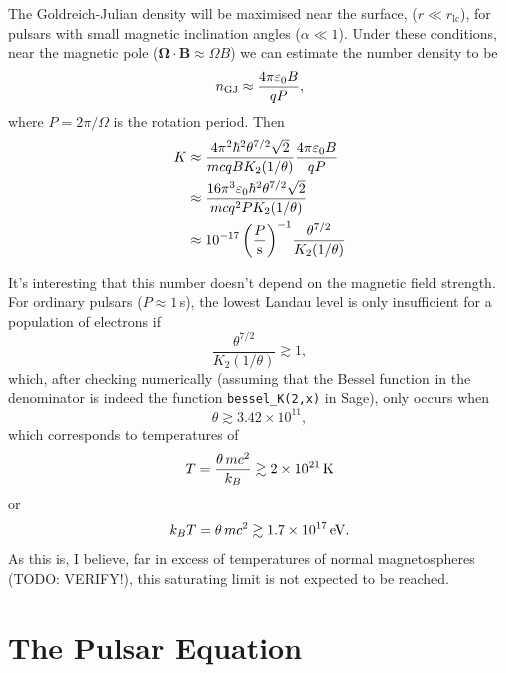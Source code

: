 \documentclass{book}
\newcommand{\todo}[1]{{\color{red}TODO: {#1}}}
\newcommand{\rL}{r_\text{lc}} %
\newcommand{\nGJ}{n_{\rm GJ}}
\begin{document}
The Goldreich-Julian density will be maximised near the surface, ($r \ll \rL$), for pulsars with small magnetic inclination angles ($\alpha \ll 1$).
Under these conditions, near the magnetic pole (${\pmb \Omega}\cdot{\pmb B} \approx \Omega B$) we can estimate the number density to be
\begin{equation}
  \nGJ \approx \frac{4\pi\varepsilon_0 B}{qP},
\end{equation}
where $P = 2\pi/\Omega$ is the rotation period.
Then
\begin{equation}
  \begin{aligned}
    K &\approx \frac{4\pi^2 \hbar^2 \theta^{7/2} \sqrt{2}}{mcqB K_2(1/\theta)} \frac{4\pi\varepsilon_0 B}{qP} \\
      &\approx \frac{16\pi^3 \varepsilon_0 \hbar^2 \theta^{7/2} \sqrt{2}}{mcq^2 P K_2(1/\theta)} \\
      &\approx 10^{-17} \, \bigg(\frac{P}{\rm s} \bigg)^{-1} \frac{\theta^{7/2}}{K_2(1/\theta)}
  \end{aligned}
\end{equation}

It's interesting that this number doesn't depend on the magnetic field strength.
For ordinary pulsars ($P \approx 1\,$s), the lowest Landau level is only insufficient for a population of electrons if
\begin{equation}
  \frac{\theta^{7/2}}{K_2(1/\theta)} \gtrsim 1,
\end{equation}
which, after checking numerically (assuming that the Bessel function in the denominator is indeed the function \texttt{bessel\_K(2,x)} in Sage), only occurs when
\begin{equation}
  \theta \gtrsim 3.42 \times 10^{11},
\end{equation}
which corresponds to temperatures of
\begin{equation}
  T = \frac{\theta \, mc^2}{k_B}
    \gtrsim 2 \times 10^{21}\,{\rm K}
\end{equation}
or
\begin{equation}
  k_B T = \theta\,mc^2
    \gtrsim 1.7 \times 10^{17}\,{\rm eV}.
\end{equation}
As this is, I believe, far in excess of temperatures of normal magnetospheres (\todo{VERIFY!}), this saturating limit is not expected to be reached.

\section{The Pulsar Equation}
\end{document}
